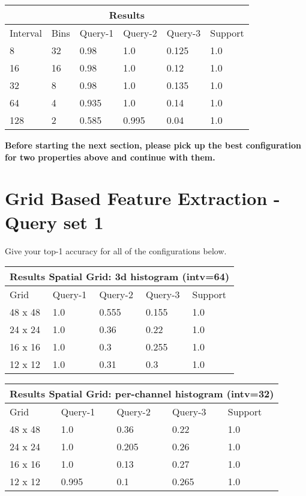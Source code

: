 \documentclass[12pt]{article}
\begin{document}
\begin{tabular}{ |p{1.5cm}|p{1.5cm}||p{2cm}|p{2cm}|p{2cm}|p{2cm}|  }
    \hline
    \multicolumn{6}{|c|}{Results} \\
    \hline
    Interval & Bins & Query-1 & Query-2 & Query-3 & Support \\
    \hline
    8 & 32 & 0.98 & 1.0 & 0.125 & 1.0 \\
    \hline
    16 & 16 & 0.98 & 1.0 & 0.12 & 1.0 \\
    \hline
    32 & 8 & 0.98 & 1.0 & 0.135 & 1.0 \\
    \hline
    64 & 4 & 0.935 & 1.0 & 0.14 & 1.0 \\
    \hline
    128 & 2 & 0.585 & 0.995 & 0.04 & 1.0 \\
    \hline
\end{tabular}

\vspace{1cm}


\newpage
\textbf{Before starting the next section, please pick up the best configuration for two properties above and continue with them.}

\section{Grid Based Feature Extraction - Query set 1}
Give your top-1 accuracy for all of the configurations below.


\begin{tabular}{ |p{1.5cm}||p{2cm}|p{2cm}|p{2cm}|p{2cm}|  }
    \hline
    \multicolumn{5}{|c|}{Results Spatial Grid: 3d histogram (intv=64)} \\
    \hline
    Grid & Query-1 & Query-2 & Query-3 & Support \\
    \hline
    48 x 48 & 1.0 & 0.555 & 0.155 & 1.0 \\
    \hline
    24 x 24 & 1.0 & 0.36 & 0.22 & 1.0 \\
    \hline
    16 x 16 & 1.0 & 0.3 & 0.255 & 1.0 \\
    \hline
    12 x 12 & 1.0 & 0.31 & 0.3 & 1.0 \\
    \hline
\end{tabular}

\vspace*{1cm}

\begin{tabular}{ |p{1.5cm}||p{2cm}|p{2cm}|p{2cm}|p{2cm}|  }
    \hline
    \multicolumn{5}{|c|}{Results Spatial Grid: per-channel histogram (intv=32)} \\
    \hline
    Grid & Query-1 & Query-2 & Query-3 & Support \\
    \hline
    48 x 48 & 1.0 & 0.36 & 0.22 & 1.0 \\
    \hline
    24 x 24 & 1.0 & 0.205 & 0.26 & 1.0 \\
    \hline
    16 x 16 & 1.0 & 0.13 & 0.27 & 1.0 \\
    \hline
    12 x 12 & 0.995 & 0.1 & 0.265 & 1.0 \\
    \hline
\end{tabular}
\end{document}
